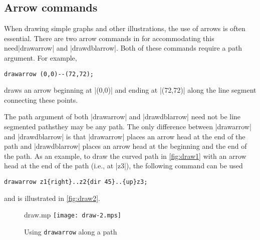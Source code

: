 \subsection{Arrow commands}

When drawing simple graphs and other illustrations, the use of arrows is
often essential.  There are two arrow commands in \MP{} for
accommodating this need\Dash |drawarrow| and |drawdblarrow|.  Both of
these commands require a path argument.  For example,

\begin{lstlisting}[style=MP]
drawarrow (0,0)--(72,72);
\end{lstlisting}
draws an arrow beginning at |(0,0)| and ending at |(72,72)| along the
line segment connecting these points.

The path argument of both |drawarrow| and |drawdblarrow| need not be
line segmented paths\Dash they may be any \MP{} path.  The only
difference between |drawarrow| and |drawdblarrow| is that |drawarrow|
places an arrow head at the end of the path and |drawdblarrow| places an
arrow head at the beginning and the end of the path.  As an example, to
draw the curved path in \autoref{fig:draw1} with an arrow head at the
end of the path (i.e., at |z3|), the following command can be used

\begin{lstlisting}[style=MP]
drawarrow z1{right}..z2{dir 45}..{up}z3;
\end{lstlisting}
and is illustrated in \autoref{fig:draw2}.

\begin{figure}
  \begin{withattachment}{draw.mp}
    \centering
    \texttt{[image: draw-2.mps]}
  \end{withattachment}
  \caption{Using \texttt{drawarrow} along a path}
  \label{fig:draw2}
\end{figure}
